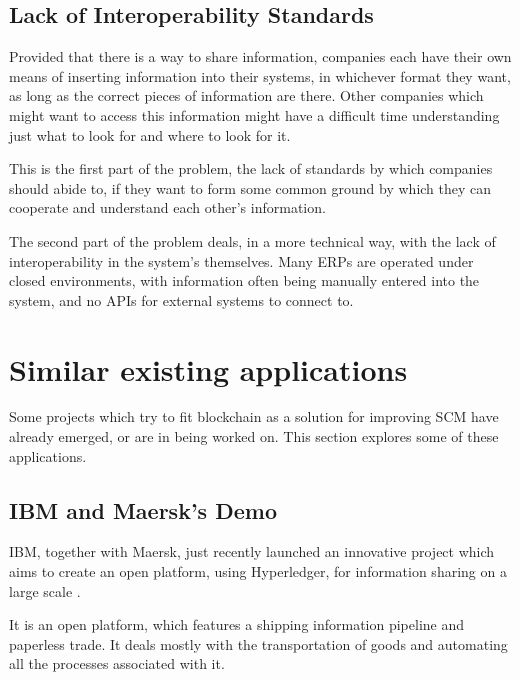 \subsection{Lack of Interoperability Standards}
Provided that there is a way to share information, companies each have their own means of inserting information into their systems, in whichever format they want, as long as the correct pieces of information are there. Other companies which might want to access this information might have a difficult time understanding just what to look for and where to look for it. 

This is the first part of the problem, the lack of standards by which companies should abide to, if they want to form some common ground by which they can cooperate and understand each other's information. 

The second part of the problem deals, in a more technical way, with the lack of interoperability in the system's themselves. Many ERPs are operated under closed environments, with information often being manually entered into the system, and no APIs for external systems to connect to.

\section{Similar existing applications}
Some projects which try to fit blockchain as a solution for improving SCM have already emerged, or are in being worked on. This section explores some of these applications.

\subsection{IBM and Maersk's Demo}
IBM, together with Maersk, just recently launched an innovative project which aims to create an open platform, using Hyperledger, for information sharing on a large scale \cite{A.P.MOLLER-MAERSK}.

It is an open platform, which features a shipping information pipeline and paperless trade. It deals mostly with the transportation of goods and automating all the processes associated with it.


